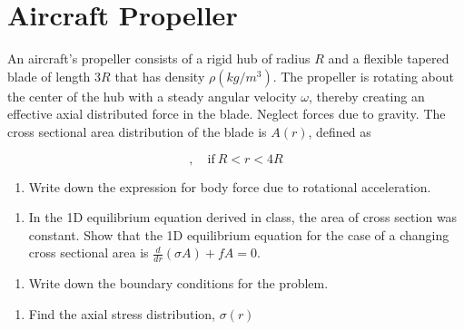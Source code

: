 

\section{Aircraft Propeller}
An aircraft’s propeller consists of a rigid hub of radius $R$ and a flexible tapered blade of length $3R$ that has density $\rho (kg/m^3)$. The propeller is rotating about the center of the hub with a steady angular velocity $\omega$, thereby creating an effective axial distributed force in the blade. Neglect forces due to gravity. The cross sectional area distribution of the blade is $A(r)$, defined as

\begin{equation*}
    , \quad \text{if}\ R < r< 4R
\end{equation*}

\begin{figure}[h]
    \centering
    
\end{figure}
\begin{enumerate}[label=\alph*., start = 1]
    \item Write down the expression for body force due to rotational acceleration. 
    
\end{enumerate}



\pagebreak
\pagestyle{fancy}
\restoregeometry



\begin{enumerate}[label=\alph*., start = 2]
    \item In the 1D equilibrium equation derived in class, the area of cross section was constant. Show that the 1D equilibrium equation for the case of a changing cross sectional area is $\frac{d}{dr}(\sigma A) + fA = 0.$
\end{enumerate}

\begin{enumerate}[label=\alph*., start = 3]
    \item  Write down the boundary conditions for the problem. 
\end{enumerate}

\begin{enumerate}[label=\alph*., start = 4]
    \item Find the axial stress distribution, $\sigma(r)$
\end{enumerate}